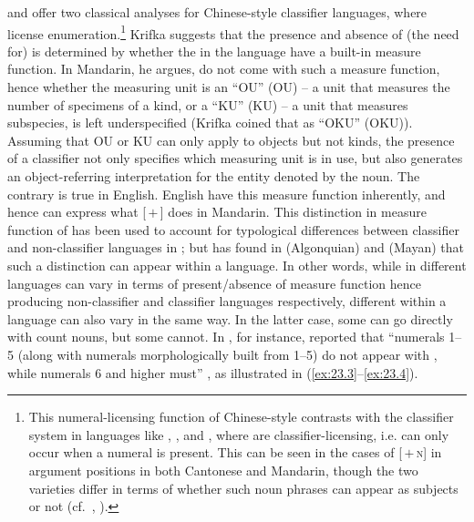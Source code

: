 \documentclass[output=paper]{langsci/langscibook}
\begin{document}
\citet{Krifka1995} and \citet{Chierchia1998} offer two classical analyses for
Chinese-style classifier languages, where 
license enumeration.\footnote{This numeral-licensing function of Chinese-style
     contrasts with the classifier system in
    languages like  \citep{Watanabe2006}, 
    \parencite{VazquezRojasMaldonado2012}, and  \citep{Massam2009},
    where  are classifier-licensing, i.e.   can
    only occur when a numeral is present. This can be seen in the
    cases of [\Clf{}\,$+$\,\textsc{n}] in argument positions in both Cantonese and
    Mandarin, though the two varieties differ in terms of whether such noun
    phrases can appear as subjects or not (cf.\ \citealt{ChengSybesma1999},
\citealt{Sio2006}).} Krifka suggests that the presence and absence of (the need
for)  is determined by whether the  in the
language have a built-in measure function. In Mandarin, he argues,
 do not come with such a measure function, hence whether the
measuring unit is an \enquote{\glsdesc{OU}} (\gls{OU}) -- a unit
that measures the number of specimens of a kind, or a \enquote{\glsdesc{KU}}
(\gls{KU}) -- a unit that measures subspecies, is left
underspecified (Krifka coined that as \enquote{\glsdesc{OKU}}
(\gls{OKU})). Assuming that \gls{OU} or \gls{KU} can only apply
to objects but not kinds, the presence of a classifier not only
specifies which measuring unit is in use, but also generates an
object-referring interpretation for the entity denoted by the noun. The
contrary is true in English. English  have this measure function
inherently, and hence can express what [\Num{}\,$+$\,\Clf] does in
Mandarin.  This distinction in measure function of 
has been used to account for typological differences between
classifier and non-classifier languages in \citet{Krifka1995};
but \citet{BaleCoon2014} has found in  (Algonquian) and 
(Mayan) that such a distinction can appear within a language. In other words,
while  in different languages can vary in terms of
present/absence of measure function hence producing non-classifier and
classifier languages respectively, different  within a language
can also vary in the same way. In the latter case, some  can go
directly with count nouns, but some cannot. In , for instance,
\citeauthor{BaleCoon2014} reported that “numerals 1--5 (along with numerals
morphologically built from 1--5) do not appear with , while
numerals 6 and higher must” \parencite[700]{BaleCoon2014}, as illustrated in
(\ref{ex:23.3}--\ref{ex:23.4}).
\end{document}
